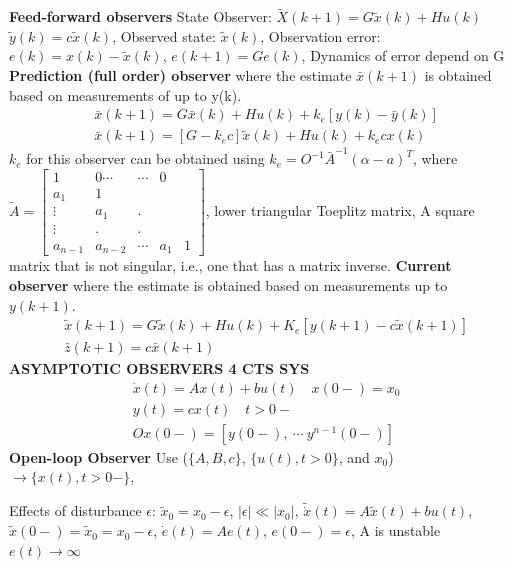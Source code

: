 \textbf{Feed-forward observers} State Observer: $\tilde{X}(k+1)=G\tilde{x}(k)+Hu(k)$
$\tilde{y}(k)=c \tilde{x}(k)$, Observed state: $\tilde{x}(k)$, Observation error: $e(k)=x(k)-\tilde{x}(k)$, $e(k+1)=Ge(k)$, Dynamics of error depend on G \hfill \break 
\textbf{Prediction (full order) observer} where the estimate $\bar{x}(k+1)$ is obtained based on measurements of up to y(k).
\vspace*{-0.2cm}
\begin{align*}
& \bar{x}(k+1)=G\bar{x}(k)+Hu(k)+k_e[y(k)-\bar{y}(k)] \\
& \bar{x}(k+1)=[G-k_e c] \tilde{x}(k)+Hu(k)+k_ecx(k)
\end{align*}
$k_e$ for this observer can be obtained 
using $k_e=O^{-1}\bar{A}^{-1}(\alpha-a)^T$, where \hfill \break 
$\tilde{A}=\begin{bmatrix}
1   & 0 \cdots & \cdots & 0 \\
a_1 & 1 & & \\
\vdots & a_1 & . &  \\
\vdots & . & . & \\
a_{n-1} & a_{n-2} & \cdots & a_1 & 1
\end{bmatrix}$, \hfill \break  lower triangular Toeplitz matrix, A square matrix that is not singular, i.e., one that has a matrix inverse.
\textbf{Current observer} where the estimate is obtained based on measurements
up to $y(k+1)$.
\vspace*{-0.15cm}
\begin{align*}
& \tilde{x}(k+1)=G\tilde{x}(k)+Hu(k)+K_e[y(k+1)-c\tilde{x}(k+1)] \\
& \bar{z}(k+1)=c\bar{x}(k+1)
\end{align*}
\vspace*{-0.15cm}
\textbf{ASYMPTOTIC OBSERVERS 4 CTS
SYS} 
\vspace*{-0.15cm}
\begin{align*}
& \dot{x}(t) = A x(t)+bu(t) \quad x(0-)=x_0 \\
& y(t) = cx(t) \quad t > 0- \\
& O x(0-) = [y(0-), \ \cdots \ y^{n-1}(0-)]
\end{align*}
\textbf{Open-loop Observer}
Use ($\{A,B,c\}$, $\{u(t), t> 0\}$, and $x_0$) $\rightarrow \{x(t),t>0-\}$,

Effects of disturbance $\epsilon$:
$\tilde{x}_0=x_0-\epsilon$, $|\epsilon| \ll |x_0|$, $\tilde{\dot{x}}(t)=A \tilde{x}(t)+bu(t)$, $\tilde{x}(0-)=\tilde{x}_0=x_0-\epsilon$,
$\dot{e}(t)=Ae(t)$, $e(0-)=\epsilon$, A is unstable $e(t) \rightarrow \infty$

